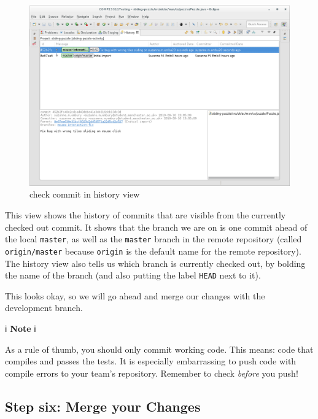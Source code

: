\documentclass[
]{book}
\begin{document}
\begin{figure}

{\centering \includegraphics[width=1\linewidth]{images/checkCommitInHistoryView} 

}

\caption{check commit in history view}\label{fig:checkCommitInHistoryView-fig}
\end{figure}

This view shows the history of commits that are visible from the currently checked out commit. It shows that the branch we are on is one commit ahead of the local \texttt{master}, as well as the \texttt{master} branch in the remote repository (called \texttt{origin/master} because \texttt{origin} is the default name for the remote repository). The history view also tells us which branch is currently checked out, by bolding the name of the branch (and also putting the label \texttt{HEAD} next to it).

This looks okay, so we will go ahead and merge our changes with the development branch.

ℹ️ \textbf{Note} ℹ️

As a rule of thumb, you should only commit working code. This means: code that compiles and passes the tests. It is especially embarrassing to push code with compile errors to your team's repository. Remember to check \emph{before} you push!

\hypertarget{mergechanges}{%
\subsection{Step six: Merge your Changes}\label{mergechanges}}
\end{document}
